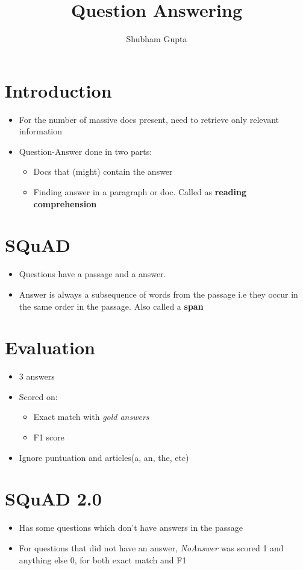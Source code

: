 \documentclass[a4paper]{article}
\title{Question Answering}
\author{Shubham Gupta}
\begin{document}
\maketitle
\section{Introduction}
\begin{itemize}
    \item For the number of massive docs present, need to retrieve only relevant information
    \item Question-Answer done in two parts:
        \begin{itemize}
            \item Docs that (might) contain the answer
            \item Finding answer in a paragraph or doc. Called as \textbf{reading comprehension}  
        \end{itemize}
\end{itemize}
\section{SQuAD}
\begin{itemize}
    \item Questions have a passage and a answer.
    \item Answer is always a subsequence of words from the passage i.e they occur in the same order in the passage. Also called a \textbf{span}  
\end{itemize}
\section{Evaluation}
\begin{itemize}
    \item 3 answers
    \item Scored on:
        \begin{itemize}
            \item Exact match with \textit{gold answers} 
            \item F1 score 
        \end{itemize}
    \item Ignore puntuation and articles(a, an, the, etc)
\end{itemize}
\section{SQuAD 2.0}
\begin{itemize}
    \item Has some questions which don't have answers in the passage
    \item For questions that did not have an answer, \textit{NoAnswer} was scored 1 and anything else 0, for both exact match and F1
\end{itemize}
\end{document}
